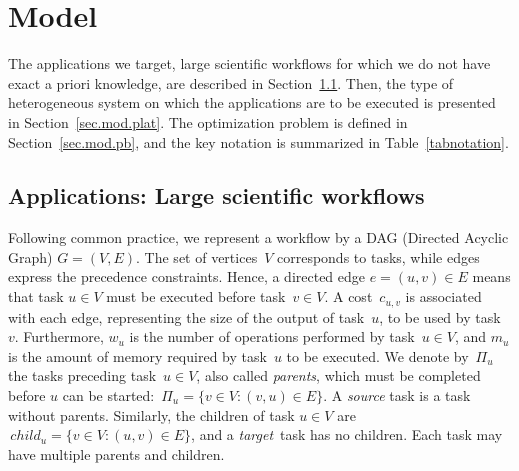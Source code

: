 \documentclass[conference]{IEEEtran}
\newcommand{\parents}[1]{\,\Pi_{#1}}
\newcommand{\children}[1]{\,child_{#1}}
\newcommand{\skug}[1]{{\color{blue}[SK: #1]}}
\begin{document}
\section{Model} %
\label{sec:model}
%
The applications we target, large scientific workflows for which we do not have exact a priori knowledge,
are described in Section~\ref{sec.mod.work}. Then, the type of heterogeneous system on which
the applications are to be executed is presented in Section~\ref{sec.mod.plat}. The optimization problem
is defined in Section~\ref{sec.mod.pb}, and the key notation is summarized in Table~\ref{tabnotation}.


\subsection{Applications: Large scientific workflows}
\label{sec.mod.work}
%
Following common practice, we represent a workflow by a DAG (Directed Acyclic Graph) 
$G=(V,E)$. The set of vertices~$V$ corresponds to tasks, while edges express the
precedence constraints. Hence, a directed edge $e=(u,v)\in E$ means that task $u\in V$ must be executed 
before task~$v\in V$. A cost~$c_{u,v}$ is associated with each edge, representing the size of the 
output of task~$u$, to be used by task~$v$. 
Furthermore, $w_u$ is the number of operations performed by task~$u\in V$, 
and $m_u$ is the amount of memory required by task~$u$ to be executed. 
We denote by $\parents{u}$ the tasks preceding task~$u\in V$, also called {\em parents}, 
which must be completed before $u$ can be started:   
$ \parents{u} = \{v \in V: (v,u) \in E\}$. A {\em source} task is a task without parents. %
Similarly, the children of task $u\in V$ are %
$ \children{u} = \{v \in V: (u,v) \in E\}$, and a {\em target} task has no children. 
Each task may have multiple parents and children.
\end{document}
